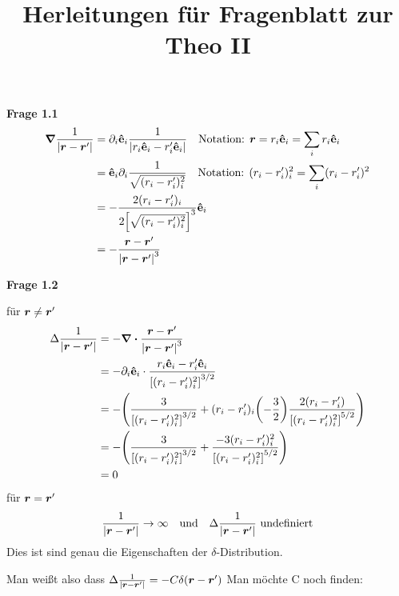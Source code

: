 
\title{Herleitungen für Fragenblatt zur Theo II}

   
  \newpage

  \textbf{Frage 1.1}
  \begin{equation*}
    \begin{split}
      \grad \frac{1}{\abs{\vb*{r}-\vb*{r}'}} 
        &= \partial_i \vu e_i \frac{1}{\abs{r_i \vu e_i - r_i' \vu e_i}}
        \quad\text{Notation: } \vb* r = r_i \vu e_i = \sum_i r_i \vu e_i\\
        &= \vu e_i \partial_i \frac{1}{\sqrt{(r_i-r_i')_i^2}}
        \quad\text{Notation: }(r_i-r'_i)^2_i=\sum_i(r_i-r'_i)^2\\
        &= 
        -\frac{2(r_i-r_i')_i}{2\qty[\sqrt{(r_i-r_i')_i^2}]^{3}}\vu e_i \\
        &= -\frac{\vb* r - \vb* r'}{\abs{\vb* r - \vb* r'}^3} 
    \end{split}
  \end{equation*}

  \textbf{Frage 1.2}

  für $\vb* r \neq \vb* r'$
  \begin{equation*}
    \begin{split}
      \Delta \frac{1}{\abs{\vb*{r}-\vb*{r}'}}
      &=-\div\frac{\vb* r - \vb* r'}{\abs{\vb* r - \vb* r'}^3}\\  
      &=-\partial_i \vu e_i \cdot 
      \frac{r_i \vu e_i - r'_i \vu e_i}
      {\qty[(r_i - r'_i)_i^2]^{3/2}}\\  
      &=-\qty(
      \frac{3}{\qty[(r_i - r'_i)_i^2]^{3/2}}
      +(r_i-r'_i)_i\qty(-\frac{3}{2})\frac{2(r_i-r'_i)}
      {{\qty[(r_i-r'_i)_i^2]}^{5/2}}
      )\\  
      &=-\qty(
      \frac{3}{\qty[(r_i-r'_i)_i^2]^{3/2}} 
      + \frac{-3(r_i-r'_i)_i^2}{\qty[(r_i-r'_i)_i^2]^{5/2}}
      )\\
      &=0
    \end{split}
  \end{equation*}
  für $\vb* r=\vb* r'$
  \begin{equation*}
    \frac{1}{\abs{\vb*{r}-\vb*{r}'}}\to \infty\quad \text{und}\quad \Delta\frac{1}{\abs{\vb*{r}-\vb*{r}'}}\ \text{undefiniert}
  \end{equation*}
  Dies ist sind genau die Eigenschaften der $\delta$-Distribution.

  Man weißt also dass $\Delta \frac{1}{\abs{\vb*{r}-\vb*{r}'}}=-C\delta(\vb* r - \vb* r')$
  Man möchte C noch finden:

